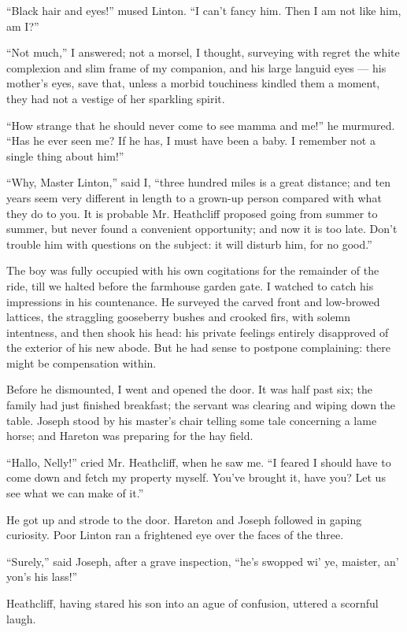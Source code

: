 \par “Black hair and eyes!” mused Linton. “I can't fancy him. Then I am not like him, am I?”
\par “Not much,” I answered; not a morsel, I thought, surveying with regret the white complexion and slim frame of my companion, and his large languid eyes — his mother's eyes, save that, unless a morbid touchiness kindled them a moment, they had not a vestige of her sparkling spirit.
\par “How strange that he should never come to see mamma and me!” he murmured. “Has he ever seen me? If he has, I must have been a baby. I remember not a single thing about him!”
\par “Why, Master Linton,” said I, “three hundred miles is a great distance; and ten years seem very different in length to a grown-up person compared with what they do to you. It is probable Mr. Heathcliff proposed going from summer to summer, but never found a convenient opportunity; and now it is too late. Don't trouble him with questions on the subject: it will disturb him, for no good.”
\par The boy was fully occupied with his own cogitations for the remainder of the ride, till we halted before the farmhouse garden gate. I watched to catch his impressions in his countenance. He surveyed the carved front and low-browed lattices, the straggling gooseberry bushes and crooked firs, with solemn intentness, and then shook his head: his private feelings entirely disapproved of the exterior of his new abode. But he had sense to postpone complaining: there might be compensation within.
\par Before he dismounted, I went and opened the door. It was half past six; the family had just finished breakfast; the servant was clearing and wiping down the table. Joseph stood by his master's chair telling some tale concerning a lame horse; and Hareton was preparing for the hay field.
\par “Hallo, Nelly!” cried Mr. Heathcliff, when he saw me. “I feared I should have to come down and fetch my property myself. You've brought it, have you? Let us see what we can make of it.”
\par He got up and strode to the door. Hareton and Joseph followed in gaping curiosity. Poor Linton ran a frightened eye over the faces of the three.
\par “Surely,” said Joseph, after a grave inspection, “he's swopped wi' ye, maister, an' yon's his lass!”
\par Heathcliff, having stared his son into an ague of confusion, uttered a scornful laugh.
